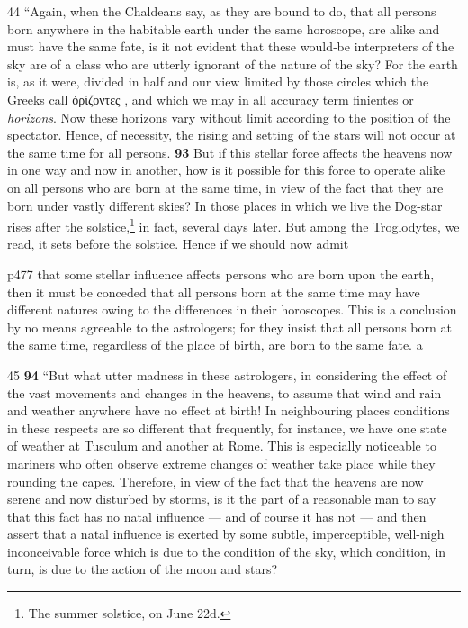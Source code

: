 44
``Again, when the Chaldeans say, as they are bound to do, that all persons born anywhere in the habitable earth under the same horoscope, are alike and must have the same fate, is it not evident that these would\texthebrew{‑}be interpreters of the sky are of a class who are utterly ignorant of the nature of the sky? For the earth is, as it were, divided in half and our view limited by those circles which the Greeks call \textgreek{\texthebrew{ὁ}ρίζοντες} , and which we may in all accuracy term finientes or \emph{horizons}. Now these horizons vary without limit according to the position of the spectator. Hence, of necessity, the rising and setting of the stars will not occur at the same time for all persons. \textbf{93} But if this stellar force affects the heavens now in one way and now in another, how is it possible for this force to operate alike on all persons who are born at the same time, in view of the fact that they are born under vastly different skies? In those places in which we live the Dog-star rises after the solstice,\texthebrew{}\footnote{The summer solstice, on June 22d.

} in fact, several days later. But among the Troglodytes, we read, it sets before the solstice. Hence if we should now admit

p477 that some stellar influence affects persons who are born upon the earth, then it must be conceded that all persons born at the same time may have different natures owing to the differences in their horoscopes. This is a conclusion by no means agreeable to the astrologers; for they insist that all persons born at the same time, regardless of the place of birth, are born to the same fate.\texthebrew{} a

45
\textbf{94} ``But what utter madness in these astrologers, in considering the effect of the vast movements and changes in the heavens, to assume that wind and rain and weather anywhere have no effect at birth! In neighbouring places conditions in these respects are so different that frequently, for instance, we have one state of weather at Tusculum and another at Rome. This is especially noticeable to mariners who often observe extreme changes of weather take place while they rounding the capes. Therefore, in view of the fact that the heavens are now serene and now disturbed by storms, is it the part of a reasonable man to say that this fact has no natal influence \texthebrew{—} and of course it has not \texthebrew{—} and then assert that a natal influence is exerted by some subtle, imperceptible, well-nigh inconceivable force which is due to the condition of the sky, which condition, in turn, is due to the action of the moon and stars?

